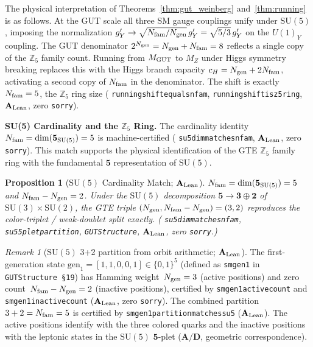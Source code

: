 \documentclass[11pt]{article}
\newtheorem{proposition}[theorem]{Proposition}
\theoremstyle{remark}
\newtheorem{remark}[theorem]{Remark}
\newcommand{\Ngen}{N_{\rm gen}}
\newcommand{\Nfam}{N_{\rm fam}}
\newcommand{\cH}{c_H}
\newcommand{\lean}[1]{%
  \penalty-100
  \begingroup\def\_{\textunderscore\allowbreak}\texttt{#1}\endgroup}
\newcommand{\CatAL}{\ensuremath{\textbf{A}_{\rm Lean}}}
\newcommand{\CatAD}{\textbf{A/D}}
\begin{document}
The physical interpretation of Theorems~\ref{thm:gut_weinberg} and~\ref{thm:running}
is as follows.
At the GUT scale all three SM gauge couplings unify under $\mathrm{SU}(5)$, imposing
the normalization $g'_Y \to \sqrt{\Nfam/\Ngen}\,g'_Y = \sqrt{5/3}\,g'_Y$ on the
$U(1)_Y$ coupling.
The GUT denominator $2^{\Ngen} = \Ngen + \Nfam = 8$ reflects a single copy of the
$\mathbb{Z}_5$ family count.
Running from $M_{\rm GUT}$ to $M_Z$ under Higgs symmetry breaking replaces this
with the Higgs branch capacity $\cH = \Ngen + 2\Nfam$, activating a second copy
of $\Nfam$ in the denominator.
The shift is exactly $\Nfam = 5$, the $\mathbb{Z}_5$ ring size
(\lean{running\_shift\_equals\_nfam}, \lean{running\_shift\_is\_z5\_ring}, $\CatAL$,
zero \texttt{sorry}).

\medskip

\noindent\textbf{SU(5) Cardinality and the $\mathbb{Z}_5$ Ring.}\enspace
The cardinality identity $\Nfam = \dim(\mathbf{5}_{\mathrm{SU}(5)}) = 5$ is
machine-certified (\lean{su5\_dim\_matches\_nfam}, $\CatAL$, zero \texttt{sorry}).
This match supports the physical identification of the GTE $\mathbb{Z}_5$ family ring
with the fundamental $\mathbf{5}$ representation of $\mathrm{SU}(5)$.

\begin{proposition}[$\mathrm{SU}(5)$ Cardinality Match; $\CatAL$]
\label{prop:su5}
$\Nfam = \dim(\mathbf{5}_{\mathrm{SU}(5)}) = 5$ and $\Nfam - \Ngen = 2$.
Under the $\mathrm{SU}(5)$ decomposition $\mathbf{5} \to \mathbf{3} \oplus \mathbf{2}$
of $\mathrm{SU}(3) \times \mathrm{SU}(2)$, the GTE triple $(\Ngen, \Nfam - \Ngen) = (3,2)$
reproduces the color-triplet / weak-doublet split exactly.
(\lean{su5\_dim\_matches\_nfam}, \lean{su5\_5plet\_partition}, \texttt{GUTStructure},
$\CatAL$, zero \texttt{sorry}.)
\end{proposition}

\begin{remark}[$\mathrm{SU}(5)$ 3+2 partition from orbit arithmetic; $\CatAL$]
\label{rem:su5_partition}
The first-generation state $\mathrm{gen}_1 = [1,1,0,0,1] \in \{0,1\}^5$
(defined as \lean{sm\_gen1} in \texttt{GUTStructure~\S19}) has Hamming weight~$\Ngen = 3$
(active positions) and zero count~$\Nfam - \Ngen = 2$ (inactive positions),
certified by \lean{sm\_gen1\_active\_count} and \lean{sm\_gen1\_inactive\_count}
($\CatAL$, zero \texttt{sorry}).
The combined partition $3 + 2 = \Nfam = 5$ is certified by
\lean{sm\_gen1\_partition\_matches\_su5} ($\CatAL$).
The active positions identify with the three colored quarks and the inactive positions
with the leptonic states in the $\mathrm{SU}(5)$ $\mathbf{5}$-plet ($\CatAD$,
geometric correspondence).
\end{remark}
\end{document}
